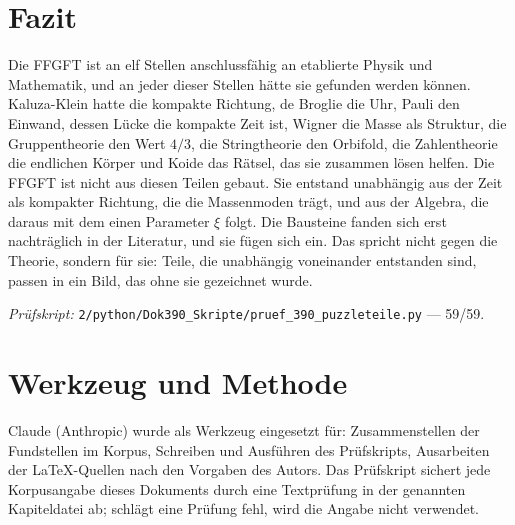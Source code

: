 \section{Fazit}

Die FFGFT ist an elf Stellen anschlussfähig an etablierte Physik und Mathematik, und an jeder
dieser Stellen hätte sie gefunden werden können. Kaluza-Klein hatte die kompakte Richtung, de
Broglie die Uhr, Pauli den Einwand, dessen Lücke die kompakte Zeit ist, Wigner die Masse als
Struktur, die Gruppentheorie den Wert $4/3$, die Stringtheorie den Orbifold, die Zahlentheorie die
endlichen Körper und Koide das Rätsel, das sie zusammen lösen helfen. Die FFGFT ist nicht aus diesen
Teilen gebaut. Sie entstand unabhängig aus der Zeit als kompakter Richtung, die die Massenmoden
trägt, und aus der Algebra, die daraus mit dem einen Parameter $\xi$ folgt. Die Bausteine fanden
sich erst nachträglich in der Literatur, und sie fügen sich ein. Das spricht nicht gegen die
Theorie, sondern für sie: Teile, die unabhängig voneinander entstanden sind, passen in ein Bild,
das ohne sie gezeichnet wurde.

\vspace{1em}
\noindent\textit{Prüfskript:} \texttt{2/python/Dok390\_Skripte/pruef\_390\_puzzleteile.py}
--- 59/59.

\section*{Werkzeug und Methode}

Claude (Anthropic) wurde als Werkzeug eingesetzt für: Zusammenstellen der Fundstellen im Korpus,
Schreiben und Ausführen des Prüfskripts, Ausarbeiten der \LaTeX-Quellen nach den Vorgaben des
Autors. Das Prüfskript sichert jede Korpusangabe dieses Dokuments durch eine Textprüfung in der
genannten Kapiteldatei ab; schlägt eine Prüfung fehl, wird die Angabe nicht verwendet.

